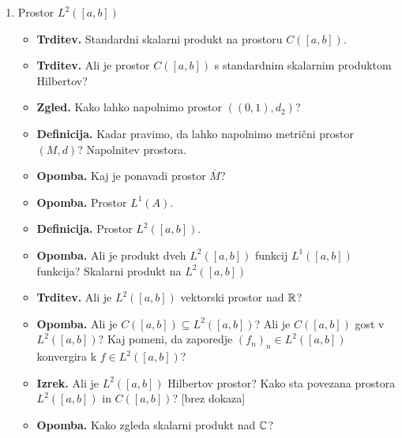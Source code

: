 \begin{enumerate}
    \item Prostor \(L^2([a,b])\)
    \begin{itemize}
        \item \textbf{Trditev.} Standardni skalarni produkt na prostoru \(C([a,b])\).
        \item \textbf{Trditev.} Ali je prostor \(C([a,b])\) s standardnim skalarnim produktom Hilbertov?
        \item \textbf{Zgled.} Kako lahko napolnimo prostor \(((0,1), d_2)\)?
        \item \textbf{Definicija.} Kadar pravimo, da lahko napolnimo metrični prostor \((M, d)\)? Napolnitev prostora.
        \item \textbf{Opomba.} Kaj je ponavadi prostor \(\overline{M}\)?
        \item \textbf{Opomba.} Prostor \(L^1(A)\).
        \item \textbf{Definicija.} Prostor \(L^2([a,b])\).
        \item \textbf{Opomba.} Ali je produkt dveh \(L^2([a,b])\) funkcij \(L^1([a,b])\) funkcija? Skalarni produkt na \(L^2([a,b])\)
        \item \textbf{Trditev.} Ali je \(L^2([a,b])\) vektorski prostor nad \(\mathbb{R}\)?
        \item \textbf{Opomba.} Ali je \(C([a,b]) \subseteq L^2([a,b])\)? Ali je \(C([a,b])\) gost v \(L^2([a,b])\)? Kaj pomeni, da zaporedje \((f_n)_n \in L^2([a,b])\) konvergira k \(f \in L^2([a,b])\)?
        \item \textbf{Izrek.} Ali je \(L^2([a,b])\) Hilbertov prostor? Kako sta povezana prostora \(L^2([a,b])\) in \(C([a, b])\)? [brez dokaza]
        \item \textbf{Opomba.} Kako zgleda skalarni produkt nad \(\mathbb{C}\)?
    \end{itemize}
\end{enumerate}